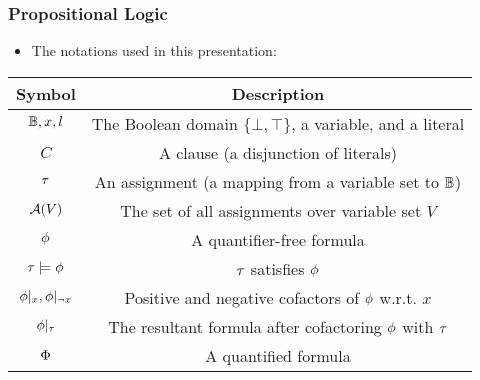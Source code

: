\begin{frame}
    \frametitle{Propositional Logic}
    \begin{itemize}
        \item The notations used in this presentation:
              \pause
    \end{itemize}
    \begin{table}[t]
        \centering
        \begin{tabular}{c|c}
            Symbol                      & Description                                                   \\
            \hline
            $\mathbb{B},x,l$              & The Boolean domain $\{\bot,\top\}$, a variable, and a literal \\
            $C$                         & A clause (a disjunction of literals)                          \\
            $\tau$                       & An assignment (a mapping from a variable set to $\mathbb{B}$)   \\
            $\mathcal{A}(V)$                    & The set of all assignments over variable set $V$              \\
            $\phi$                       & A quantifier-free formula                                     \\
            $\tau\models\phi$             & $\tau$ satisfies $\phi$                                         \\
            $\phi|_{x},\phi|_{\lnot x}$ & Positive and negative cofactors of $\phi$ w.r.t. $x$           \\
            $\phi|_{\tau}$            & The resultant formula after cofactoring $\phi$ with $\tau$      \\
            $\Phi$                       & A quantified formula                                          \\
        \end{tabular}
    \end{table}
\end{frame}